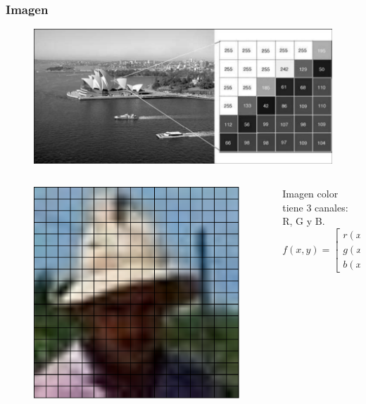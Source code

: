 \begin{frame}
    \frametitle{Imagen}
    
    \begin{figure}[!h]
        \includegraphics[width=0.4\columnwidth]{images/camera_grayscale_image_pixels.pdf}
    \end{figure}   
    
    \begin{columns}
    	\begin{column}{0.5\textwidth}
		    \begin{figure}[!h]
			\includegraphics[width=0.4\columnwidth]{images/image_pixels.pdf}
			\end{figure}
    	\end{column}
    	\begin{column}{0.3\textwidth}
		Imagen color tiene 3 canales: R, G y B.
		\begin{equation*}
			f(x,y)=
			\begin{bmatrix}
				r(x,y) \\
				g(x,y) \\
				b(x,y)
			\end{bmatrix}
		\end{equation*}
    	\end{column}
    \end{columns}
\end{frame}

